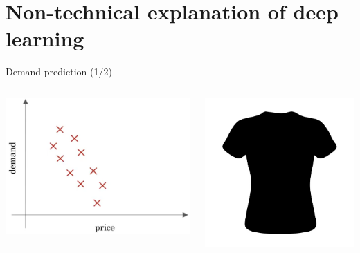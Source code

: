 \documentclass[pdf]{beamer}
\theoremstyle{mystyle}
\begin{document}
\section{Non-technical explanation of deep learning}
\begin{frame}{Demand prediction (1/2)}
	\begin{columns}[c]		
		\begin{column}{0.6\textwidth}
			\hspace{20pt}
			\includegraphics[scale=.225]{demand-prediction}
		\end{column}
		\hspace{-10pt}
		\begin{column}{0.4\textwidth}
			\includegraphics[scale=.225]{t-shirt}				
		\end{column}		
	\end{columns}	
\end{frame}
\end{document}
